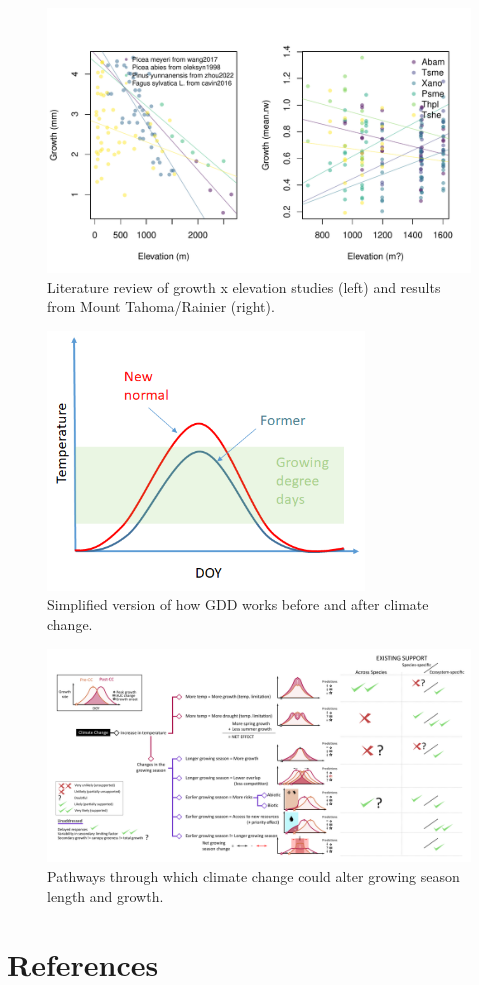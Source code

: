\documentclass[11pt]{article}
\begin{document}
\begin{figure}[h!]
\includegraphics[width=1\textwidth]{..//analyses/growthxelevationetc/figures/growthxelev2part.pdf}
\caption{Literature review of growth x elevation studies (left) and results from Mount Tahoma/Rainier (right).}
\label{fig:gxelev}
\end{figure}


\begin{figure}[h!]
\includegraphics[width=0.75\textwidth]{..//figures/simpletempcurve_fromlucidboard.png}
\caption{Simplified version of how GDD works before and after climate change.}
\label{fig:simpletemp}
\end{figure}




\begin{figure}[h!]
\includegraphics[width=1\textwidth]{..//figures/some conceptual figure2.0.png}
\caption{Pathways through which climate change could alter growing season length and growth.}
\label{fig:pathways}
\end{figure}


\clearpage
\section{References}


\end{document}
